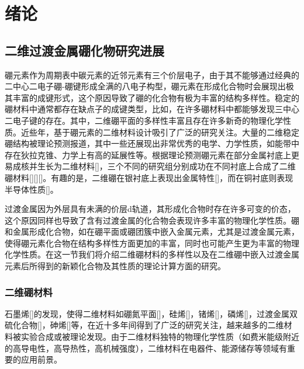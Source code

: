 \documentclass[phd,nobackinfo]{scutthesis}
\begin{document}
\listoffigures

\listoftables

\mainmatter

\chapter{绪论}\label{chapter_introduction}
\section{二维过渡金属硼化物研究进展}

硼元素作为周期表中碳元素的近邻元素有三个价层电子，由于其不能够通过经典的二中心二电子硼-硼键形成全满的八电子构型，硼元素在形成化合物时会展现出极其丰富的成键形式，这个原因导致了硼的化合物有极为丰富的结构多样性。稳定的硼材料中通常都存在缺点子的成键类型，比如，在许多硼材料中都能够发现三中心二电子键的存在。其中，二维硼平面的多样性丰富且存在许多新奇的物理化学性质。近些年，基于硼元素的二维材料设计吸引了广泛的研究关注。大量的二维稳定硼结构被理论预测报道，其中一些还展现出非常优秀的电学、力学性质，如能带中存在狄拉克锥、力学上有高的延展性等。根据理论预测硼元素在部分金属衬底上更易成核并生长为二维材料[]，三个不同的研究组分别成功在不同衬底上合成了二维硼材料[][][]。有趣的是，二维硼在银衬底上表现出金属特性[]，而在铜衬底则表现半导体性质[]。

过渡金属因为外层具有未满的价层d轨道，其形成化合物时存在许多可变的价态，这个原因同样也导致了含有过渡金属的化合物会表现许多丰富的物理化学性质。硼和金属形成化合物，如在硼平面或硼团簇中嵌入金属元素，尤其是过渡金属元素，使得硼元素化合物在结构多样性方面更加的丰富，同时也可能产生更为丰富的物理化学性质。在这一节我们将介绍二维硼材料的多样性以及在二维硼中嵌入过渡金属元素后所得到的新颖化合物及其性质的理论计算方面的研究。

\subsection{二维硼材料}
石墨烯[]的发现，使得二维材料如硼氮平面[]，硅烯[]，锗烯[]，磷烯[]，过渡金属双硫化合物[]，砷烯[]等，在近十多年间得到了广泛的研究关注，越来越多的二维材料被实验合成或被理论发现。由于二维材料独特的物理化学性质（如费米能级附近的高导电性，高导热性，高机械强度），二维材料在电器件、能源储存等领域有重要的应用前景。
\end{document}
